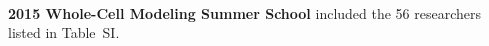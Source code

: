 \documentclass[journal,transmag]{IEEEtran}
\begin{document}
\begin{IEEEbiography}{}
~\\
~\\
~\\
~\\
~\\
~\\
~\\
~\\
~\\
~\\
~\\
\textbf{2015 Whole-Cell Modeling Summer School} included the 56 researchers listed in Table~SI.
\end{IEEEbiography}



\vfill



\clearpage
\setcounter{table}{0}
\renewcommand{\thetable}{S\Roman{table}}
\end{document}
